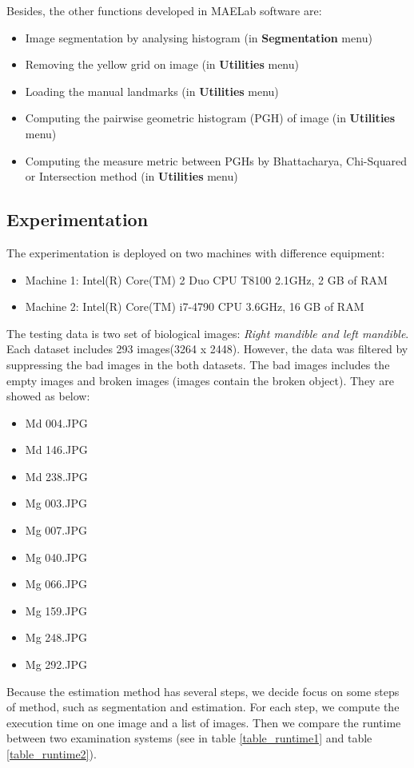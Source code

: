 Besides, the other functions developed in MAELab software are:
\begin{itemize}
\item Image segmentation by analysing histogram (in \textbf{Segmentation} menu)
\item Removing the yellow grid on image (in \textbf{Utilities} menu)
\item Loading the manual landmarks (in \textbf{Utilities} menu)
\item Computing the pairwise geometric histogram (PGH) of image (in \textbf{Utilities} menu)
\item Computing the measure metric between PGHs by Bhattacharya, Chi-Squared or Intersection method (in \textbf{Utilities} menu)
\end{itemize}
\subsection{Experimentation}
The experimentation is deployed on two machines with difference equipment:
\begin{itemize}
\item Machine 1: Intel(R) Core(TM) 2 Duo CPU T8100 2.1GHz, 2 GB of RAM
\item Machine 2: Intel(R) Core(TM) i7-4790 CPU 3.6GHz, 16 GB of RAM
\end{itemize}
The testing data is two set of biological images: \textit{Right mandible and left mandible}. Each dataset includes 293 images(3264 x 2448). However, the data was filtered by suppressing the bad images in the both datasets. The bad images includes the empty images and broken images (images contain the broken object). They are showed as below:
\begin{multicols}{3}
\begin{itemize}
\item Md 004.JPG
\item Md 146.JPG
\item Md 238.JPG
\item Mg 003.JPG
\item Mg 007.JPG
\item Mg 040.JPG
\item Mg 066.JPG
\item Mg 159.JPG
\item Mg 248.JPG
\item Mg 292.JPG
\end{itemize} 
\end{multicols}
Because the estimation method has several steps, we decide focus on some steps of method, such as segmentation and estimation. For each step, we compute the execution time on one image and a list of images. Then we compare the runtime between two examination systems (see in table \ref{table_runtime1} and table \ref{table_runtime2}).

